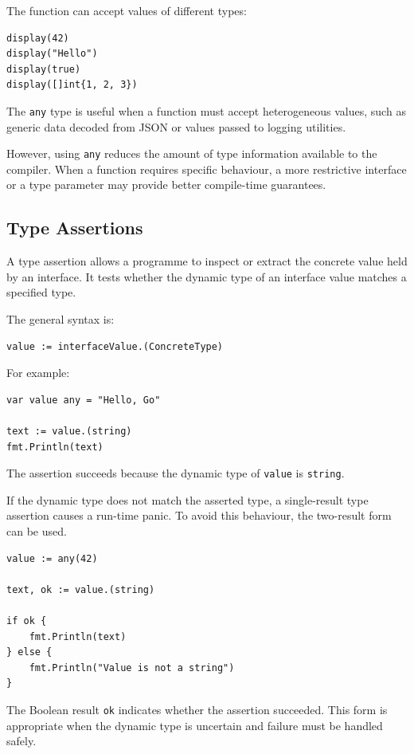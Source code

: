 The function can accept values of different types:

\begin{lstlisting}
display(42)
display("Hello")
display(true)
display([]int{1, 2, 3})
\end{lstlisting}

The \texttt{any} type is useful when a function must accept heterogeneous values, such as generic data decoded from JSON or values passed to logging utilities.

However, using \texttt{any} reduces the amount of type information available to the compiler. When a function requires specific behaviour, a more restrictive interface or a type parameter may provide better compile-time guarantees.

\subsection{Type Assertions}

A type assertion allows a programme to inspect or extract the concrete value held by an interface. It tests whether the dynamic type of an interface value matches a specified type.

The general syntax is:

\begin{lstlisting}
value := interfaceValue.(ConcreteType)
\end{lstlisting}

For example:

\begin{lstlisting}
var value any = "Hello, Go"

text := value.(string)
fmt.Println(text)
\end{lstlisting}

The assertion succeeds because the dynamic type of \texttt{value} is \texttt{string}.

If the dynamic type does not match the asserted type, a single-result type assertion causes a run-time panic. To avoid this behaviour, the two-result form can be used.

\begin{lstlisting}
value := any(42)

text, ok := value.(string)

if ok {
    fmt.Println(text)
} else {
    fmt.Println("Value is not a string")
}
\end{lstlisting}

The Boolean result \texttt{ok} indicates whether the assertion succeeded. This form is appropriate when the dynamic type is uncertain and failure must be handled safely.

